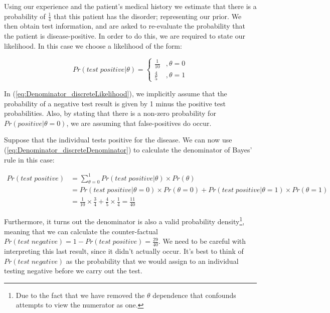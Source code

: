 \documentclass[11pt,fullpage]{book}
\begin{document}
Using our experience and the patient's medical history we estimate that there is a probability of $\frac{1}{4}$ that this patient has the disorder; representing our prior. We then obtain test information, and are asked to re-evaluate the probability that the patient is disease-positive. In order to do this, we are required to state our likelihood. In this case we choose a likelihood of the form:

\begin{equation}\label{eq:Denominator_discreteLikelihood}
Pr(test\;positive|\theta) =
\begin{cases}
\frac{1}{10} & , \theta=0\\
\frac{4}{5} & ,  \theta=1
\end{cases}
\end{equation}

In (\ref{eq:Denominator_discreteLikelihood}), we implicitly assume that the probability of a negative test result is given by 1 minus the positive test probabilities. Also, by stating that there is a non-zero probability for $Pr(positive|\theta=0)$, we are assuming that false-positives do occur.

Suppose that the individual tests positive for the disease. We can now use (\ref{eq:Denominator_discreteDenominator}) to calculate the denominator of Bayes' rule in this case:

\begin{equation}
\begin{align}
Pr(test\; positive) &= \sum\limits_{\theta=0}^{1} Pr(test\; positive|\theta) \times Pr(\theta)\\
&= Pr(test\; positive|\theta=0) \times Pr(\theta=0) + Pr(test\; positive|\theta=1) \times Pr(\theta=1)\\
&= \frac{1}{10} \times \frac{3}{4} + \frac{4}{5} \times \frac{1}{4} = \frac{11}{40}
\end{align}
\end{equation}

Furthermore, it turns out the denominator is also a valid probability density\footnote{Due to the fact that we have removed the $\theta$ dependence that confounds attempts to view the numerator as one.}, meaning that we can calculate the counter-factual $Pr(test\; negative) = 1 - Pr(test\; positive) = \frac{29}{40}$. We need to be careful with interpreting this last result, since it didn't actually occur. It's best to think of $Pr(test\; negative)$ as the probability that we would assign to an individual testing negative before we carry out the test.
\end{document}
